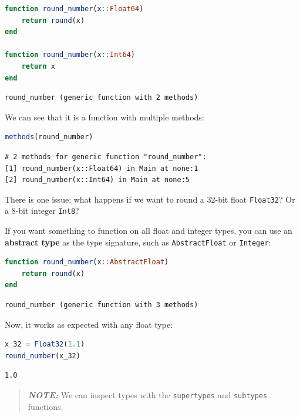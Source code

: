 \documentclass[
  notoc %
]{tufte-book}
\newcommand{\passthrough}[1]{#1}
\begin{document}
\begin{lstlisting}[language=Julia]
function round_number(x::Float64)
    return round(x)
end

function round_number(x::Int64)
    return x
end
\end{lstlisting}

\begin{lstlisting}[language=Output]
round_number (generic function with 2 methods)
\end{lstlisting}

We can see that it is a function with multiple methods:

\begin{lstlisting}[language=Julia]
methods(round_number)
\end{lstlisting}

\begin{lstlisting}[language=Output]
# 2 methods for generic function "round_number":
[1] round_number(x::Float64) in Main at none:1
[2] round_number(x::Int64) in Main at none:5
\end{lstlisting}

There is one issue: what happens if we want to round a 32-bit float
\passthrough{\lstinline!Float32!}? Or a 8-bit integer
\passthrough{\lstinline!Int8!}?

If you want something to function on all float and integer types, you
can use an \textbf{abstract type} as the type signature, such as
\passthrough{\lstinline!AbstractFloat!} or
\passthrough{\lstinline!Integer!}:

\begin{lstlisting}[language=Julia]
function round_number(x::AbstractFloat)
    return round(x)
end
\end{lstlisting}

\begin{lstlisting}[language=Output]
round_number (generic function with 3 methods)
\end{lstlisting}

Now, it works as expected with any float type:

\begin{lstlisting}[language=Julia]
x_32 = Float32(1.1)
round_number(x_32)
\end{lstlisting}

\begin{lstlisting}[language=Output]
1.0
\end{lstlisting}

\begin{quote}
\textbf{\emph{NOTE:}} We can inspect types with the
\passthrough{\lstinline!supertypes!} and
\passthrough{\lstinline!subtypes!} functions.
\end{quote}
\end{document}
